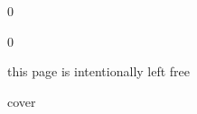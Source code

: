 \documentclass[
    b5paper,  %
    10pt, %
    final, %
    twoside, %
    openright, %
    livetypeset %
]{compostelathesis}
\newcommand\SkipBackmatter{0}
\let\printglossary\relax
\begin{document}



\mainmatter
\pagestyle{compostela}
\glsresetall







\if\SkipBackmatter0
    \if{}
        \appendix
    \fi
    
    
\fi



\backmatter
\cleardoublepage
\printbibliography
\cleardoublepage
\printglossary
\cleardoublepage
\pagestyle{empty}
%




\if\SkipBackmatter0
  \if{}
      \cleardoublepage
      \begin{center}
          \vspace*{4cm}this page is intentionally left free
      \end{center}
      \cleardoublepage
      \begin{center}
          \vspace*{4cm}cover
      \end{center}
  \else
      \cleardoublepage
      \phantom{this page is left free}
      \cleardoublepage
      
  \fi
\fi

\end{document}
